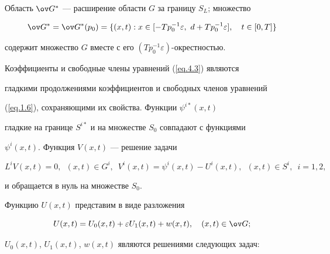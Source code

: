 Область $\ov G^*$ --- расширение области $G$ за границу $S_L$; множество


\begin{equation}


\label{eq.4.4}


\ov G^*=\ov G^*(p_0)=\{(x, t): x\in [-T p^{-1}_0 \varepsilon,\ d+T p_0^{-1}


\varepsilon], \quad t\in [0, T]\}


\end{equation}


содержит множество $G$ вместе с его $(T p_0^{-1} \varepsilon)$-окрестностью.


Коэффициенты и свободные члены уравнений (\ref{eq.4.3}) являются


гладкими продолжениями коэффициентов и свободных членов уравнений


(\ref{eq.1.6}), сохраняющими их свойства. Функции $\psi^{i*}(x, t)$


гладкие на границе $S^{i*}$ и на множестве $S_0$ совпадают с функциями


$\psi^i(x, t)$. Функция $V(x, t)$ --- решение задачи


$$


L^i V(x, t)=0, \ \; (x, t)\in G^i, \ \;


V^i(x, t)=\psi^i(x, t)-U^i(x, t), \ \; (x, t)\in S^i, \ \; i=1, 2,


$$


и обращается в нуль на множестве $S_0$.





Функцию $U(x, t)$ представим в виде разложения


$$


U(x, t)=U_0(x, t)+\varepsilon U_1(x,t)+w(x,t), \quad (x, t)\in \ov G;


$$


$U_0(x, t)$, $U_1(x, t)$, $w(x, t)$ являются решениями следующих задач:


